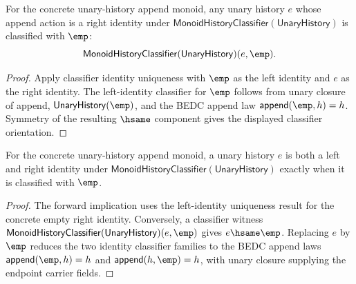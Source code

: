 \begin{theorem}
\label{thm:unary-append-monoid-right-identity-empty}
For the concrete unary-history append monoid, any unary history $e$ whose
append action is a right identity under
$\mathsf{MonoidHistoryClassifier}(\mathsf{UnaryHistory})$ is classified with
$\emp$:
$$
\mathsf{MonoidHistoryClassifier}(\mathsf{UnaryHistory})(e,\emp).
$$
\end{theorem}
\begin{proof}
Apply classifier identity uniqueness with $\emp$ as the left identity and $e$
as the right identity. The left-identity classifier for $\emp$ follows from
unary closure of append, $\mathsf{UnaryHistory}(\emp)$, and the BEDC append law
$\mathsf{append}(\emp,h)=h$. Symmetry of the resulting $\hsame$ component gives
the displayed classifier orientation.
\end{proof}

\begin{theorem}
\label{thm:unary-append-monoid-identity-empty-iff}
For the concrete unary-history append monoid, a unary history $e$ is both a
left and right identity under
$\mathsf{MonoidHistoryClassifier}(\mathsf{UnaryHistory})$ exactly when it is
classified with $\emp$.
\end{theorem}
\begin{proof}
The forward implication uses the left-identity uniqueness result for the
concrete empty right identity. Conversely, a classifier witness
$\mathsf{MonoidHistoryClassifier}(\mathsf{UnaryHistory})(e,\emp)$ gives
$e\hsame\emp$. Replacing $e$ by $\emp$ reduces the two identity classifier
families to the BEDC append laws
$\mathsf{append}(\emp,h)=h$ and $\mathsf{append}(h,\emp)=h$, with unary closure
supplying the endpoint carrier fields.
\end{proof}

